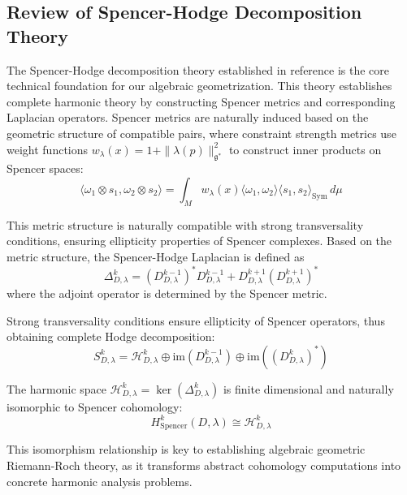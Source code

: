 \documentclass[a4paper,12pt]{extarticle}
\theoremstyle{definition}
\begin{document}
\subsection{Review of Spencer-Hodge Decomposition Theory}

The Spencer-Hodge decomposition theory established in reference\cite{zheng2025geometric} is the core technical foundation for our algebraic geometrization. This theory establishes complete harmonic theory by constructing Spencer metrics and corresponding Laplacian operators. Spencer metrics are naturally induced based on the geometric structure of compatible pairs, where constraint strength metrics use weight functions $w_\lambda(x) = 1 + \|\lambda(p)\|^2_{\mathfrak{g}^*}$ to construct inner products on Spencer spaces:
\begin{equation}\label{eq:spencer-metric}
\langle\omega_1 \otimes s_1, \omega_2 \otimes s_2\rangle = \int_M w_\lambda(x) \langle\omega_1, \omega_2\rangle \langle s_1, s_2\rangle_{\mathrm{Sym}} \, d\mu
\end{equation}

This metric structure is naturally compatible with strong transversality conditions, ensuring ellipticity properties of Spencer complexes. Based on the metric structure, the Spencer-Hodge Laplacian is defined as
\begin{equation}\label{eq:spencer-laplacian}
\Delta^k_{D,\lambda} = (D^{k-1}_{D,\lambda})^* D^{k-1}_{D,\lambda} + D^{k+1}_{D,\lambda}(D^{k+1}_{D,\lambda})^*
\end{equation}
where the adjoint operator is determined by the Spencer metric.

Strong transversality conditions ensure ellipticity of Spencer operators\cite{zheng2025mirror, zheng2025constructing}, thus obtaining complete Hodge decomposition:
\begin{equation}\label{eq:hodge-decomp}
S^k_{D,\lambda} = \mathcal{H}^k_{D,\lambda} \oplus \mathrm{im}(D^{k-1}_{D,\lambda}) \oplus \mathrm{im}((D^k_{D,\lambda})^*)
\end{equation}

The harmonic space $\mathcal{H}^k_{D,\lambda} = \ker(\Delta^k_{D,\lambda})$ is finite dimensional and naturally isomorphic to Spencer cohomology:
\begin{equation}\label{eq:hodge-isomorphism}
H^k_{\mathrm{Spencer}}(D,\lambda) \cong \mathcal{H}^k_{D,\lambda}
\end{equation}

This isomorphism relationship is key to establishing algebraic geometric Riemann-Roch theory, as it transforms abstract cohomology computations into concrete harmonic analysis problems.
\end{document}
